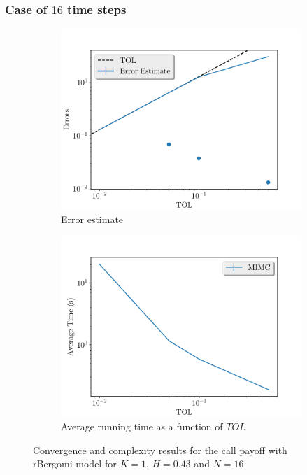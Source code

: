 \documentclass[11pt]{article}
\begin{document}
\subsubsection*{Case of $16$ time steps}
\begin{figure}[!h]
	\centering
	\begin{subfigure}{.4\textwidth}
		\centering
		\includegraphics[width=1\linewidth]{./figures/bergomi_misc/H_043/N_16/error_estimate.pdf}
		\caption{Error estimate}
		\label{fig:misc_rbergomi_8_steps_sub1}
	\end{subfigure}%
	\begin{subfigure}{.4\textwidth}
		\centering
		\includegraphics[width=1\linewidth]{./figures/bergomi_misc/H_043/N_16/average_running_time.pdf}
		\caption{Average running time as a function of $TOL$}
		\label{fig:misc_rbergomi_8_steps_sub2}
	\end{subfigure}%
	\caption{Convergence and complexity results for the call payoff with rBergomi model for $K=1$, $H=0.43$ and $N=16$.}
	\label{fig:misc_rbergomi_8_steps_1}
\end{figure}
\end{document}
